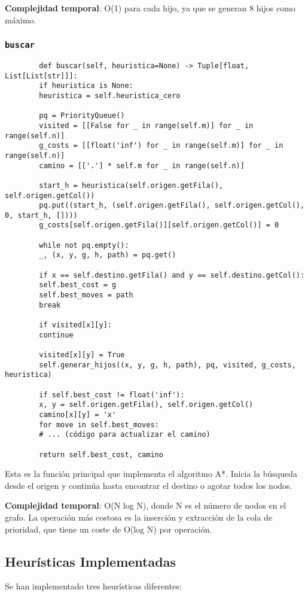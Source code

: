 \documentclass[a4paper,12pt]{article}
\begin{document}
	\textbf{Complejidad temporal}: O(1) para cada hijo, ya que se generan 8 hijos como máximo.
	
	\subsubsection{\texttt{buscar}}
	\begin{verbatim}
		def buscar(self, heuristica=None) -> Tuple[float, List[List[str]]]:
		if heuristica is None:
		heuristica = self.heuristica_cero
		
		pq = PriorityQueue()
		visited = [[False for _ in range(self.m)] for _ in range(self.n)]
		g_costs = [[float('inf') for _ in range(self.m)] for _ in range(self.n)]
		camino = [['.'] * self.m for _ in range(self.n)]
		
		start_h = heuristica(self.origen.getFila(), self.origen.getCol())
		pq.put((start_h, (self.origen.getFila(), self.origen.getCol(), 0, start_h, [])))
		g_costs[self.origen.getFila()][self.origen.getCol()] = 0
		
		while not pq.empty():
		_, (x, y, g, h, path) = pq.get()
		
		if x == self.destino.getFila() and y == self.destino.getCol():
		self.best_cost = g
		self.best_moves = path
		break
		
		if visited[x][y]:
		continue
		
		visited[x][y] = True
		self.generar_hijos((x, y, g, h, path), pq, visited, g_costs, heuristica)
		
		if self.best_cost != float('inf'):
		x, y = self.origen.getFila(), self.origen.getCol()
		camino[x][y] = 'x'
		for move in self.best_moves:
		# ... (código para actualizar el camino)
		
		return self.best_cost, camino
	\end{verbatim}
	Esta es la función principal que implementa el algoritmo A*. Inicia la búsqueda desde el origen y continúa hasta encontrar el destino o agotar todos los nodos.
	
	\textbf{Complejidad temporal}: O(N log N), donde N es el número de nodos en el grafo. La operación más costosa es la inserción y extracción de la cola de prioridad, que tiene un coste de O(log N) por operación.
	
	\subsection{Heurísticas Implementadas}
	Se han implementado tres heurísticas diferentes:
	
\end{document}
